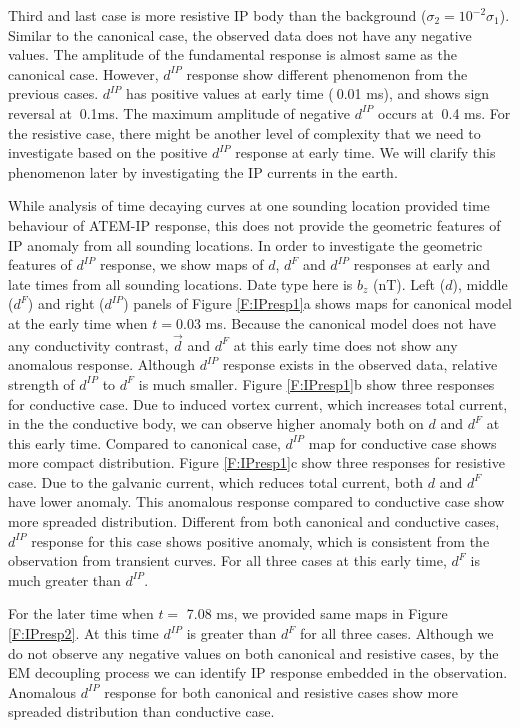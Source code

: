 \documentclass[a4paper, 11pt]{article}
\renewcommand {\d}  { {\vec d} }
\newcommand{\dip}{d^{IP}}
\begin{document}
Third and last case is more resistive IP body than the background ($\sigma_2 = 10^{-2}\sigma_1$). Similar to the canonical case, the observed data does not have any negative values. The amplitude of the fundamental response is almost same as the canonical case. However, $\dip$ response show different phenomenon from the previous cases. $\dip$ has positive values at early time ($~$0.01 ms), and shows sign reversal at $~$0.1ms. The maximum amplitude of negative $\dip$ occurs at $~$0.4 ms. For the resistive case, there might be another level of complexity that we need to investigate based on the positive $\dip$ response at early time. We will clarify this phenomenon later by investigating the IP currents in the earth. 

While analysis of time decaying curves at one sounding location provided time behaviour of ATEM-IP response, this does not provide the geometric features of IP anomaly from all sounding locations. In order to investigate the geometric features of $\dip$ response, we show maps of $d$, $d^F$ and $\dip$ responses at early and late times from all sounding locations.  Date type here is $b_z$ (nT). Left ($d$), middle ($d^F$) and right ($\dip$) panels of Figure \ref{F:IPresp1}a shows maps for canonical model at the early time when $t=$0.03 ms. Because the canonical model does not have any conductivity contrast, $\d$ and $d^F$ at this early time does not show any anomalous response. Although $\dip$ response exists in the observed data, relative strength of $\dip$ to $d^F$ is much smaller. Figure \ref{F:IPresp1}b show three responses for conductive case. Due to  induced vortex current, which increases total current, in the the conductive body, we can observe higher anomaly both on $d$ and $d^F$ at this early time. Compared to canonical case, $\dip$ map for conductive case shows more compact distribution. Figure \ref{F:IPresp1}c show three responses for resistive case. Due to the galvanic current, which reduces total current, both $d$ and $d^{F}$ have lower anomaly. This anomalous response compared to conductive case show more spreaded distribution. Different from both canonical and conductive cases, $\dip$ response for this case shows positive anomaly, which is consistent from the observation from transient curves. For all three cases at this early time, $d^F$ is much greater than $\dip$. 

For the later time when $t=$ 7.08 ms, we provided same maps in Figure \ref{F:IPresp2}. At this time $\dip$ is greater than $d^{F}$ for all three cases. Although we do not observe any negative values on both canonical and resistive cases, by the EM decoupling process we can identify IP response embedded in the observation. Anomalous $\dip$ response for both canonical and resistive cases show more spreaded distribution than conductive case. 
\end{document}
